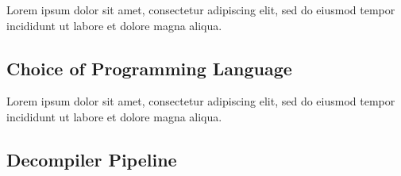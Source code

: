 \documentclass[12pt, a4paper]{article}
\begin{document}
%
%


Lorem ipsum dolor sit amet, consectetur adipiscing elit, sed do eiusmod tempor incididunt ut labore et dolore magna aliqua.


\subsection{Choice of Programming Language}

Lorem ipsum dolor sit amet, consectetur adipiscing elit, sed do eiusmod tempor incididunt ut labore et dolore magna aliqua.



\subsection{Decompiler Pipeline}


\end{document}
